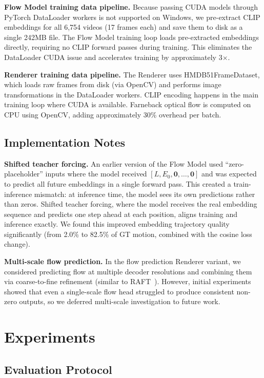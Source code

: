 \documentclass[10pt,twocolumn,letterpaper]{article}
\begin{document}
\textbf{Flow Model training data pipeline.} Because passing CUDA models
through PyTorch DataLoader workers is not supported on Windows, we
pre-extract CLIP embeddings for all 6,754 videos (17 frames each) and save
them to disk as a single 242MB file. The Flow Model training loop loads
pre-extracted embeddings directly, requiring no CLIP forward passes during
training. This eliminates the DataLoader CUDA issue and accelerates
training by approximately 3$\times$.

\textbf{Renderer training data pipeline.} The Renderer uses
HMDB51FrameDataset, which loads raw frames from disk (via OpenCV) and
performs image transformations in the DataLoader workers. CLIP encoding
happens in the main training loop where CUDA is available. Farneback
optical flow is computed on CPU using OpenCV, adding approximately 30\%
overhead per batch.

\subsection{Implementation Notes}

\textbf{Shifted teacher forcing.} An earlier version of the Flow Model used
``zero-placeholder'' inputs where the model received $[L, E_0, \mathbf{0},
\dots, \mathbf{0}]$ and was expected to predict all future embeddings in a
single forward pass. This created a train-inference mismatch: at inference
time, the model sees its own predictions rather than zeros. Shifted teacher
forcing, where the model receives the real embedding sequence and predicts
one step ahead at each position, aligns training and inference exactly. We
found this improved embedding trajectory quality significantly (from 2.0\%
to 82.5\% of GT motion, combined with the cosine loss change).

\textbf{Multi-scale flow prediction.} In the flow prediction Renderer
variant, we considered predicting flow at multiple decoder resolutions and
combining them via coarse-to-fine refinement (similar to
RAFT~\cite{teed2020}). However,
initial experiments showed that even a single-scale flow head struggled to
produce consistent non-zero outputs, so we deferred multi-scale
investigation to future work.

\section{Experiments}

\subsection{Evaluation Protocol}
\end{document}
